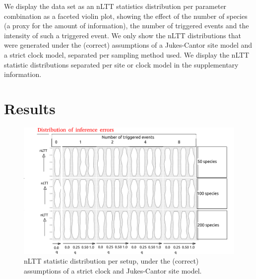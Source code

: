 \documentclass{article}
\begin{document}
We display the data set as an nLTT statistics distribution per
parameter combination as a faceted violin plot, showing
the effect of the number of species (a proxy for the amount of 
information), the number of triggered events and the intensity of such
a triggered event.
We only show the nLTT distributions
that were generated under the (correct) assumptions of a Jukes-Cantor site model
and a strict clock model, separated per sampling method used. 
We display the nLTT statistic distributions separated per site or clock model 
in the supplementary information.

\section{Results}

\begin{figure}[!htbp]
  \includegraphics[width=\textwidth]{fig_general.png}
  \caption{
    nLTT statistic distribution per setup,
    under the (correct) assumptions of a strict clock and Jukes-Cantor site model.
  }
\end{figure}

\end{document}
